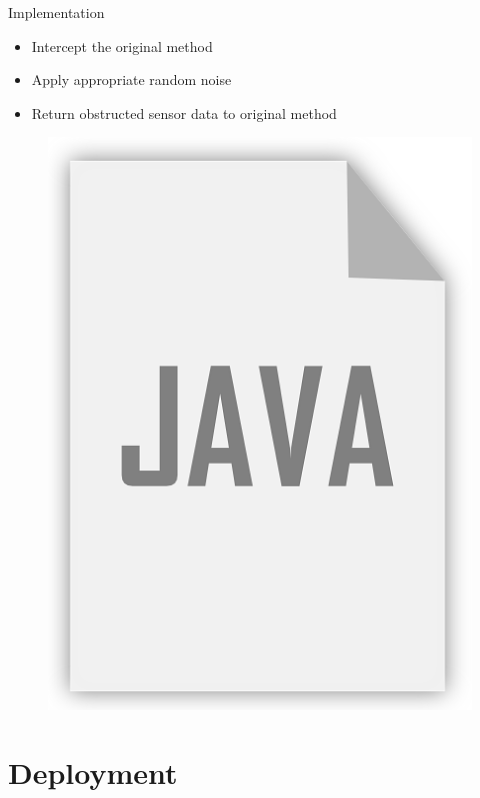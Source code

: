 \documentclass[aspectratio=169]{beamer}
[aspectratio=169] %
\begin{document}
\begin{frame}{Implementation}
  \begin{minipage}{0.49\textwidth} 
    \begin{itemize}
      \item Intercept the original method
      \pause
      \item Apply appropriate random noise
      \pause
      \item Return obstructed sensor data to original method
    \end{itemize}
  \end{minipage}
  \hfill
  \begin{minipage}{0.49\textwidth} 
    \begin{figure}
      \centering
      \includegraphics[height=0.5\textheight]{figures/java.png}
    \end{figure}
  \end{minipage}
\end{frame}

\section{Deployment}
\end{document}
